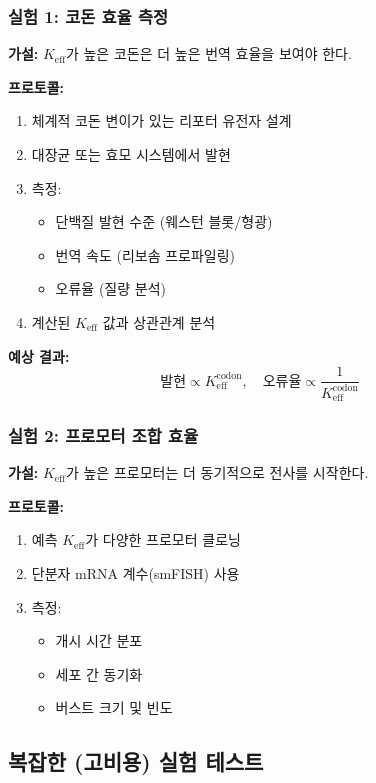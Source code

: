 \documentclass[11pt,a4paper]{article}
\begin{document}
	\subsubsection{실험 1: 코돈 효율 측정}
	\textbf{가설:} $K_{\text{eff}}$가 높은 코돈은 더 높은 번역 효율을 보여야 한다.
	
	\textbf{프로토콜:}
	\begin{enumerate}
		\item 체계적 코돈 변이가 있는 리포터 유전자 설계
		\item 대장균 또는 효모 시스템에서 발현
		\item 측정:
		\begin{itemize}
			\item 단백질 발현 수준 (웨스턴 블롯/형광)
			\item 번역 속도 (리보솜 프로파일링)
			\item 오류율 (질량 분석)
		\end{itemize}
		\item 계산된 $K_{\text{eff}}$ 값과 상관관계 분석
	\end{enumerate}
	
	\textbf{예상 결과:}
	\[
	\text{발현} \propto K_{\text{eff}}^{\text{codon}}, \quad \text{오류율} \propto \frac{1}{K_{\text{eff}}^{\text{codon}}}
	\]
	
	\subsubsection{실험 2: 프로모터 조합 효율}
	\textbf{가설:} $K_{\text{eff}}$가 높은 프로모터는 더 동기적으로 전사를 시작한다.
	
	\textbf{프로토콜:}
	\begin{enumerate}
		\item 예측 $K_{\text{eff}}$가 다양한 프로모터 클로닝
		\item 단분자 mRNA 계수(smFISH) 사용
		\item 측정:
		\begin{itemize}
			\item 개시 시간 분포
			\item 세포 간 동기화
			\item 버스트 크기 및 빈도
		\end{itemize}
	\end{enumerate}
	
	\subsection{복잡한 (고비용) 실험 테스트}
	
\end{document}
